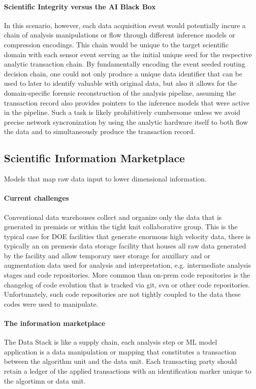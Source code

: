 \documentclass{article}
\begin{document}
\paragraph{Scientific Integrity versus the AI Black Box}
In this scenario, however, each data acquisition event would potentially incure a chain of analysis manipulations or flow through different inference models or compression encodings.
This chain would be unique to the target scientific domain with each sensor event serving as the initial unique seed for the respective analytic transaction chain.
By fundamentally encoding the event seeded routing decision chain, one could not only produce a unique data identifier that can be used to later to identify valuable with original data, but also it allows for the domain-specific forensic reconstruction of the analysis pipeline, assuming the transaction record also provides pointers to the inference models that were active in the pipeline.
Such a task is likely prohibitively cumbersome unless we avoid precise network syncronization by using the analytic hardware itself to both flow the data and to simultaneously produce the transaction record.

\subsection{Scientific Information Marketplace}
Models that map raw data input to lower dimensional information. 
\paragraph{Current challenges}
Conventional data warehouses collect and organize only the data that is generated in premisis or within the tight knit collaborative group.
This is the typical case for DOE facilities that generate enormous high velocity data, there is typically an on premesis data storage facility that houses all raw data generated by the facility and allow temporary user storage for auxillary and or augmentation data used for analysis and interpretation, e.g. intermediate analysis stages and code repositories.
More common than on-prem code repositories is the changelog of code evolution that is tracked via git, svn or other code repositories.
Unfortunately, such code repositories are not tightly coupled to the data these codes were used to manipulate.

\paragraph{The information marketplace}
The Data Stack is like a supply chain, each analysis step or ML model application is a data manipulation or mapping that constitutes a transaction between the algorithm unit and the data unit.
Each transacting party should retain a ledger of the applied transactions with an identification marker unique to the algortimn or data unit.
\end{document}
